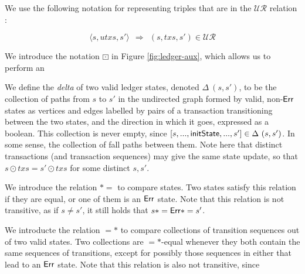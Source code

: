 We use the following notation for representing triples that are in the $\mathcal{UR}$ relation :

\[ \langle s, utxs, s' \rangle ~~ \Rightarrow ~~(s, txs, s') \in  \mathcal{UR} \]

We introduce the notation $\boxdot$ in Figure \ref{fig:ledger-aux}, which allows us to
perform an

We define the \emph{delta} of two valid ledger states, denoted $\Delta~(s, s')$, to be the collection of paths
from $s$ to $s'$ in the undirected graph formed by valid, non-$\mathsf{Err}$ states as vertices and edges labelled
by pairs of a transaction transitioning between the two states, and the direction in which
it goes, expressed as a boolean.
This collection is never empty, since $[s, ..., \mathsf{initState},..., s'] \in \Delta~(s, s')$.
In some sense, the collection of fall paths between
them. Note here that distinct transactions (and transaction sequences)
may give the same state update, so that $s \odot txs = s' \odot txs$ for some distinct $s, s'$.

We introduce the relation $*=$ to compare states. Two states satisfy this relation
if they are equal, or one of them is an $\mathsf{Err}$ state. Note that this relation is
not transitive, as if $s \neq s'$, it still holds that $s *= \mathsf{Err} *= s'$.

We introducte the relation $=*$ to compare collections of transition sequences out of two
valid states. Two collections are $=*$-equal whenever they both contain the same
sequences of transitions, except for possibly those sequences in either that lead
to an $\mathsf{Err}$ state. Note that this relation is also not transitive, since


